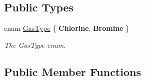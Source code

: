 \subsection*{Public Types}
\begin{DoxyCompactItemize}
\item 
enum \hyperlink{classToxicSensor_a140f14965ad9a7e71fc8a5a2ed2c919b}{Gas\+Type} \{ {\bfseries Chlorine}, 
{\bfseries Bromine}
 \}\begin{DoxyCompactList}\small\item\em The Gas\+Type enum. \end{DoxyCompactList}
\end{DoxyCompactItemize}
\subsection*{Public Member Functions}
